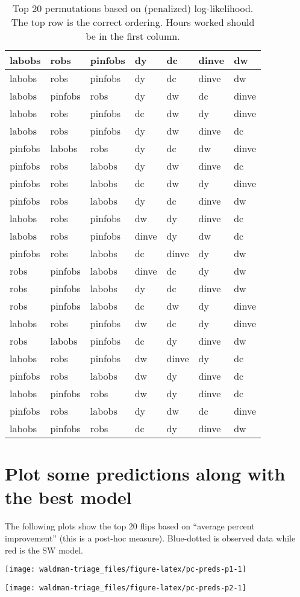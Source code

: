 \documentclass[]{article}
\begin{document}
\begin{longtable}[]{@{}lllllll@{}}
\caption{Top 20 permutations based on (penalized) log-likelihood. The
top row is the correct ordering. Hours worked should be in the first
column.}\tabularnewline
\toprule
labobs & robs & pinfobs & dy & dc & dinve & dw\tabularnewline
\midrule
\endfirsthead
\toprule
labobs & robs & pinfobs & dy & dc & dinve & dw\tabularnewline
\midrule
\endhead
labobs & pinfobs & robs & dy & dw & dc & dinve\tabularnewline
labobs & robs & pinfobs & dc & dw & dy & dinve\tabularnewline
labobs & robs & pinfobs & dy & dw & dinve & dc\tabularnewline
pinfobs & labobs & robs & dy & dc & dw & dinve\tabularnewline
pinfobs & robs & labobs & dy & dw & dinve & dc\tabularnewline
pinfobs & robs & labobs & dc & dw & dy & dinve\tabularnewline
pinfobs & robs & labobs & dy & dc & dinve & dw\tabularnewline
labobs & robs & pinfobs & dw & dy & dinve & dc\tabularnewline
labobs & robs & pinfobs & dinve & dy & dw & dc\tabularnewline
pinfobs & robs & labobs & dc & dinve & dy & dw\tabularnewline
robs & pinfobs & labobs & dinve & dc & dy & dw\tabularnewline
robs & pinfobs & labobs & dy & dc & dinve & dw\tabularnewline
robs & pinfobs & labobs & dc & dw & dy & dinve\tabularnewline
labobs & robs & pinfobs & dw & dc & dy & dinve\tabularnewline
robs & labobs & pinfobs & dc & dy & dinve & dw\tabularnewline
labobs & robs & pinfobs & dw & dinve & dy & dc\tabularnewline
pinfobs & robs & labobs & dw & dy & dinve & dc\tabularnewline
labobs & pinfobs & robs & dw & dy & dinve & dc\tabularnewline
pinfobs & robs & labobs & dy & dw & dc & dinve\tabularnewline
labobs & pinfobs & robs & dc & dy & dinve & dw\tabularnewline
\bottomrule
\end{longtable}

\hypertarget{plot-some-predictions-along-with-the-best-model}{%
\section{Plot some predictions along with the best
model}\label{plot-some-predictions-along-with-the-best-model}}

The following plots show the top 20 flips based on ``average percent
improvement'' (this is a post-hoc measure). Blue-dotted is observed data
while red is the SW model.

\begin{center}\texttt{[image: waldman-triage\_files/figure-latex/pc-preds-p1-1]} \end{center}

\begin{center}\texttt{[image: waldman-triage\_files/figure-latex/pc-preds-p2-1]} \end{center}
\end{document}
